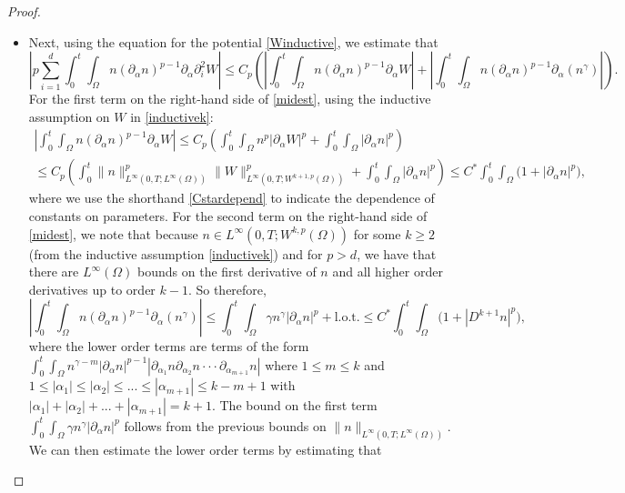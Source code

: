 \documentclass[12pt]{article}
\theoremstyle{plain}
\begin{document}
\begin{proof}
\begin{itemize}
\begin{equation*}
\end{equation*}
where we recall the shorthand $C^{*}$ from \eqref{Cstardepend}.
\item Next, using the equation for the potential \eqref{Winductive}, we estimate that
\begin{equation}\label{midest}
\left|p\sum_{i = 1}^{d} \int_{0}^{t} \int_{\Omega} n(\partial_{\alpha}n)^{p - 1} \partial_{\alpha}\partial^{2}_{i}W\right| \le C_{p}\left(\left|\int_{0}^{t} \int_{\Omega} n(\partial_{\alpha}n)^{p - 1} \partial_{\alpha} W\right| + \left|\int_{0}^{t} \int_{\Omega} n(\partial_{\alpha}n)^{p - 1} \partial_{\alpha}(n^{\gamma})\right|\right).
\end{equation}
For the first term on the right-hand side of \eqref{midest}, using the inductive assumption on $W$ in \eqref{inductivek}:
\begin{multline*}
\left|\int_{0}^{t} \int_{\Omega} n(\partial_{\alpha} n)^{p - 1} \partial_{\alpha} W\right| \le C_{p}\left(\int_{0}^{t} \int_{\Omega} n^{p} |\partial_{\alpha} W|^{p} + \int_{0}^{t} \int_{\Omega} |\partial_{\alpha}n|^{p}\right) \\
\le C_{p}\left(\int_{0}^{t}\|n\|_{L^{\infty}(0, T; L^{\infty}(\Omega))}^{p} \|W\|_{L^{\infty}(0, T; W^{k + 1, p}(\Omega))}^{p} + \int_{0}^{t} \int_{\Omega} |\partial_{\alpha} n|^{p}\right) \le C^{*}\int_{0}^{t} \int_{\Omega} \Big(1 + |\partial_{\alpha} n|^{p}\Big),
\end{multline*}
where we use the shorthand \eqref{Cstardepend} to indicate the dependence of constants on parameters. For the second term on the right-hand side of \eqref{midest}, we note that because $n \in L^{\infty}(0, T; W^{k, p}(\Omega))$ for some $k \ge 2$ (from the inductive assumption \eqref{inductivek}) and for $p > d$, we have that there are $L^{\infty}(\Omega)$ bounds on the first derivative of $n$ and all higher order derivatives up to order $k - 1$. So therefore,
\begin{equation*}
\left|\int_{0}^{t} \int_{\Omega} n(\partial_{\alpha}n)^{p - 1} \partial_{\alpha}(n^{\gamma})\right| \le \int_{0}^{t} \int_{\Omega} \gamma n^{\gamma} |\partial_{\alpha}n|^{p} + \text{l.o.t.} \le C^{*}\int_{0}^{t} \int_{\Omega} \Big(1 + |D^{k + 1}n|^{p}\Big),
\end{equation*}
where the lower order terms are terms of the form $\displaystyle \int_{0}^{t} \int_{\Omega} n^{\gamma - m} |\partial_{\alpha}n|^{p - 1} |\partial_{\alpha_{1}}n \partial_{\alpha_{2}}n \cdot \cdot \cdot \partial_{\alpha_{m+1}}n|$ where $1 \le m \le k$ and $1 \le |\alpha_{1}| \le |\alpha_{2}| \le ... \le |\alpha_{m+1}| \le k - m + 1$ with $|\alpha_{1}| + |\alpha_{2}| + ... + |\alpha_{m+1}| = k + 1$. The bound on the first term $\displaystyle \int_{0}^{t} \int_{\Omega} \gamma n^{\gamma} |\partial_{\alpha}n|^{p}$ follows from the previous bounds on $\|n\|_{L^{\infty}(0, T; L^{\infty}(\Omega))}$. We can then estimate the lower order terms by estimating that 

\end{itemize}
\end{proof}
\end{document}
